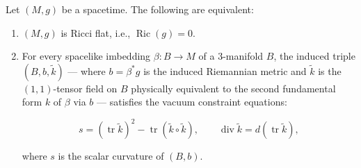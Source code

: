 Let $(M, g)$ be a spacetime. The following are equivalent:

\begin{enumerate}
\item[(a)] $(M, g)$ is Ricci flat, i.e., $\operatorname{Ric}(g) = 0$.
\item[(b)] For every spacelike imbedding $\beta: B \rightarrow M$ of a 3-manifold $B$, the induced triple $(B, b, \tilde{k})$ --- where $b = \beta^* g$ is the induced Riemannian metric and $\tilde{k}$ is the $(1,1)$-tensor field on $B$ physically equivalent to the second fundamental form $k$ of $\beta$ via $b$ --- satisfies the vacuum constraint equations:

$$
s = (\operatorname{tr} \tilde{k})^2 - \operatorname{tr}(\tilde{k} \circ \tilde{k}),
\qquad
\operatorname{div} \tilde{k} = d(\operatorname{tr} \tilde{k}),
$$

where $s$ is the scalar curvature of $(B, b)$.
\end{enumerate}

